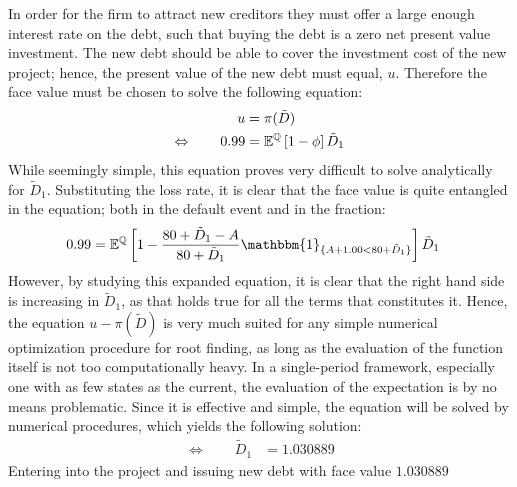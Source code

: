 \documentclass[main.tex]{subfiles}
\begin{document}
        In order for the firm to attract new creditors they must offer a large enough interest rate on the debt, 
        such that buying the debt is a zero net present value investment.
        The new debt should be able to cover the investment cost of the new project;
        hence, the present value of the new debt must equal, $u$.
        Therefore the face value must be chosen to solve the following equation:
            \begin{align}
                u &= \pi(\tilde{D}) \\
                \Leftrightarrow  \qquad
                \num{0.99} &= \mathbb{E}^{\mathbb{Q}}\left[1 - \phi\right] \tilde{D}_{1}
            \end{align}
        While seemingly simple, this equation proves very difficult to solve analytically for $\tilde{D}_{1}$.
        Substituting the loss rate, it is clear that the face value is quite entangled in the equation;
        both in the default event and in the fraction:
            \begin{align}
                \num{0.99}
                &= 
                \mathbb{E}^{\rnmeasure}\left[
                    1 
                    - 
                    \frac{
                        \num{80} + \tilde{D}_{1} - A
                    }{
                        \num{80} + \tilde{D}_{1}
                    }
                    \mathbbm{1}_{\{A + 1.00 < \num{80} + \tilde{D}_{1}\}} 
                \right] 
                \tilde{D}_{1} 
            \end{align}
        However, by studying this expanded equation, it is clear that the right hand side 
        is increasing in $\tilde{D}_{1}$, as that holds true for all the terms that constitutes it.
        Hence, the equation $u - \pi(\tilde{D})$ is very much suited for any simple numerical optimization procedure
        for root finding, as long as the evaluation of the function itself is not too computationally heavy.
        In a single-period framework, especially one with as few states as the current,
        the evaluation of the expectation is by no means problematic.
        Since it is effective and simple, the equation will be solved by numerical procedures, 
        which yields the following solution:
            \begin{align}
                \Leftrightarrow  \qquad
                \tilde{D}_{1} &= \num{1.030889}
            \end{align}
        Entering into the project and issuing new debt with face value $\num{1.030889}$ 
\end{document}
